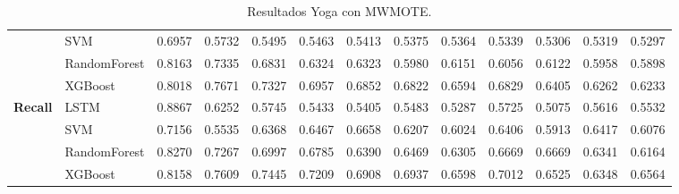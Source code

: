 \begin{table}[h]
\begin{adjustbox}{max width=15cm}
\begin{tabular}{|c|l|r|r|r|r|r|r|r|r|r|r|r|}
			& SVM &  0.6957 &  0.5732 &  0.5495 &  0.5463 &  0.5413 &  0.5375 &  0.5364 &  0.5339 &  0.5306 &  0.5319 &  0.5297 \\
			& RandomForest &  0.8163 &  0.7335 &  0.6831 &  0.6324 &  0.6323 &  0.5980 &  0.6151 &  0.6056 &  0.6122 &  0.5958 &  0.5898 \\
			& XGBoost &  0.8018 &  0.7671 &  0.7327 &  0.6957 &  0.6852 &  0.6822 &  0.6594 &  0.6829 &  0.6405 &  0.6262 &  0.6233 \\
			\hline
			\textbf{Recall} & LSTM &  0.8867 &  0.6252 &  0.5745 &  0.5433 &  0.5405 &  0.5483 &  0.5287 &  0.5725 &  0.5075 &  0.5616 &  0.5532 \\
			& SVM &  0.7156 &  0.5535 &  0.6368 &  0.6467 &  0.6658 &  0.6207 &  0.6024 &  0.6406 &  0.5913 &  0.6417 &  0.6076 \\
			& RandomForest &  0.8270 &  0.7267 &  0.6997 &  0.6785 &  0.6390 &  0.6469 &  0.6305 &  0.6669 &  0.6669 &  0.6341 &  0.6164 \\
			& XGBoost &  0.8158 &  0.7609 &  0.7445 &  0.7209 &  0.6908 &  0.6937 &  0.6598 &  0.7012 &  0.6525 &  0.6348 &  0.6564 \\
			\hline
		\end{tabular}
	\end{adjustbox}
	\caption{Resultados Yoga con MWMOTE.}
	\label{tab:Yoga_MWMOTE}
\end{table}
\newpage
